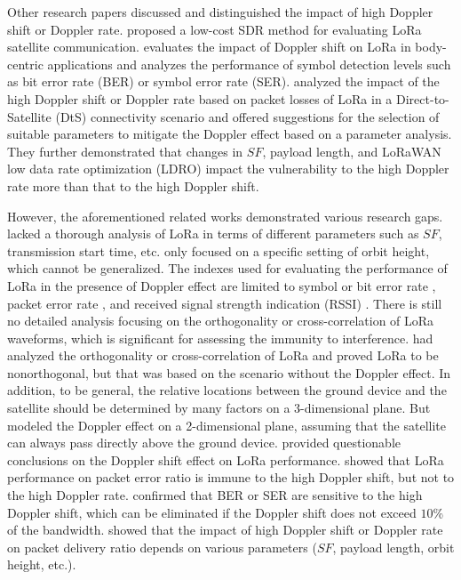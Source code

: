 Other research papers discussed and distinguished the impact of high Doppler shift or Doppler rate. \cite{colombo2022low} proposed a low-cost SDR method for evaluating LoRa satellite communication. 
\cite{ameloot2021characterizing} evaluates the impact of Doppler shift on LoRa in body-centric applications and analyzes the performance of symbol detection levels such as bit error rate (BER) or symbol error rate (SER). 
\cite{ullah2023understanding} analyzed the impact of the high Doppler shift or Doppler rate based on packet losses of LoRa in a Direct-to-Satellite (DtS) connectivity scenario and offered suggestions for the selection of suitable parameters to mitigate the Doppler effect based on a parameter analysis. They further demonstrated that changes in $SF$, payload length, and LoRaWAN low data rate optimization (LDRO) impact the vulnerability to the high Doppler rate more than that to the high Doppler shift.

However, the aforementioned related works demonstrated various research gaps. 
\cite{doroshkin2019experimental} lacked a thorough analysis of LoRa in terms of different parameters such as $SF$, transmission start time, etc. \cite{zadorozhny2022first} only focused on a specific setting of orbit height, which cannot be generalized. The indexes used for evaluating the performance of LoRa in the presence of Doppler effect are limited to symbol or bit error rate \cite{cao2021influence}, packet error rate \cite{colombo2022low,doroshkin2019experimental,zadorozhny2022first,ullah2023understanding}, and received signal strength indication (RSSI) \cite{lapapan2021lora}. There is still no detailed analysis focusing on the orthogonality or cross-correlation of LoRa waveforms, which is significant for assessing the immunity to interference. \cite{benkhelifa2022orthogonal,croce2017impact} had analyzed the orthogonality or cross-correlation of LoRa and proved LoRa to be nonorthogonal, but that was based on the scenario without the Doppler effect. In addition, to be general, the relative locations between the ground device and the satellite should be determined by many factors on a 3-dimensional plane. But \cite{cao2021influence,colombo2022low,ullah2023understanding} modeled the Doppler effect on a 2-dimensional plane, assuming that the satellite can always pass directly above the ground device. 
\cite{colombo2022low,ameloot2021characterizing,ullah2023understanding} provided questionable conclusions on the Doppler shift effect on LoRa performance. 
\cite{colombo2022low} showed that LoRa performance on packet error ratio is immune to the high Doppler shift, but not to the high Doppler rate. \cite{ameloot2021characterizing} confirmed that BER or SER are sensitive to the high Doppler shift, which can be eliminated if the Doppler shift does not exceed $10$\% of the bandwidth. 
\cite{ullah2023understanding} showed that the impact of high Doppler shift or Doppler rate on packet delivery ratio depends on various parameters ($SF$, payload length, orbit height, etc.).

